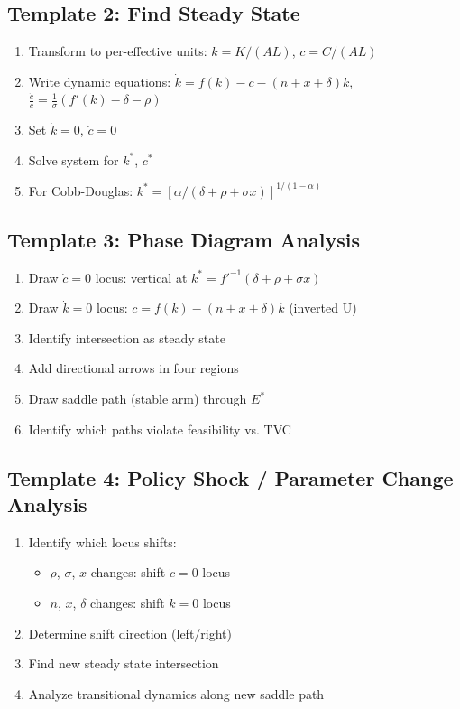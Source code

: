\documentclass[a4paper,11pt]{article}
\begin{document}
\subsection*{Template 2: Find Steady State}
\begin{enumerate}
    \item Transform to per-effective units: $k = K/(AL)$, $c = C/(AL)$
    \item Write dynamic equations: $\dot{k} = f(k) - c - (n+x+\delta)k$, $\frac{\dot{c}}{c} = \frac{1}{\sigma}(f'(k) - \delta - \rho)$
    \item Set $\dot{k} = 0$, $\dot{c} = 0$
    \item Solve system for $k^*$, $c^*$
    \item For Cobb-Douglas: $k^* = [\alpha/(\delta+\rho+\sigma x)]^{1/(1-\alpha)}$
\end{enumerate}

\subsection*{Template 3: Phase Diagram Analysis}
\begin{enumerate}
    \item Draw $\dot{c} = 0$ locus: vertical at $k^* = f'^{-1}(\delta+\rho+\sigma x)$
    \item Draw $\dot{k} = 0$ locus: $c = f(k) - (n+x+\delta)k$ (inverted U)
    \item Identify intersection as steady state
    \item Add directional arrows in four regions
    \item Draw saddle path (stable arm) through $E^*$
    \item Identify which paths violate feasibility vs. TVC
\end{enumerate}

\subsection*{Template 4: Policy Shock / Parameter Change Analysis}
\begin{enumerate}
    \item Identify which locus shifts:
        \begin{itemize}
            \item $\rho$, $\sigma$, $x$ changes: shift $\dot{c}=0$ locus
            \item $n$, $x$, $\delta$ changes: shift $\dot{k}=0$ locus
        \end{itemize}
    \item Determine shift direction (left/right)
    \item Find new steady state intersection
    \item Analyze transitional dynamics along new saddle path
\end{enumerate}
\end{document}
